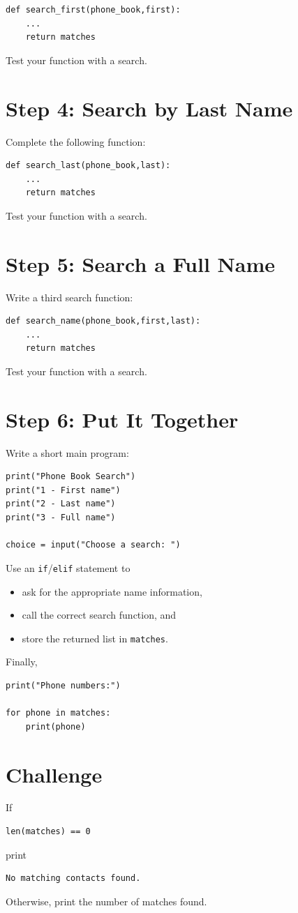 \documentclass{article}
\begin{document}
\begin{verbatim}
def search_first(phone_book,first):
    ...
    return matches
\end{verbatim}

\noindent
Test your function with a search.

\section{Step 4: Search by Last Name}

Complete the following function:

\begin{verbatim}
def search_last(phone_book,last):
    ...
    return matches
\end{verbatim}

\noindent
Test your function with a search.

\section{Step 5: Search a Full Name}

Write a third search function:

\begin{verbatim}
def search_name(phone_book,first,last):
    ...
    return matches
\end{verbatim}

\noindent
Test your function with a search.

\section{Step 6: Put It Together}

Write a short main program:

\begin{verbatim}
print("Phone Book Search")
print("1 - First name")
print("2 - Last name")
print("3 - Full name")

choice = input("Choose a search: ")
\end{verbatim}

Use an \texttt{if}/\texttt{elif} statement to

\begin{itemize}
\item ask for the appropriate name information,
\item call the correct search function, and
\item store the returned list in \texttt{matches}.
\end{itemize}

Finally,

\begin{verbatim}
print("Phone numbers:")

for phone in matches:
    print(phone)
\end{verbatim}


\section{Challenge}

If

\begin{verbatim}
len(matches) == 0
\end{verbatim}

print

\begin{verbatim}
No matching contacts found.
\end{verbatim}

Otherwise, print the number of matches found.
\end{document}
